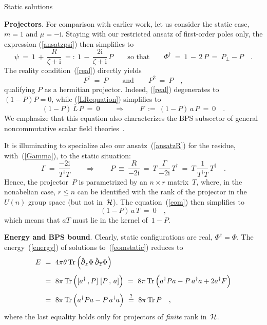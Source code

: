 \documentclass[a4paper,11pt]{article}
\makeatletter
\renewcommand{\section}{\@startsection{section}{1}{0pt}{\medskipamount}
{\medskipamount}{\large\bf}}
\numberwithin{equation}{section}
\newcommand{\Hcal}{{\cal H}}
\def\i{\mbox{i}}
\def\pa{\mbox{$\partial$}}
\newcommand{\adag}{a^{\dagger}}
\newcommand{\Tdag}{T^{\dagger}}
\newcommand{\zb}{\overline{z}}
\makeatother
\begin{document}
\section{Static solutions}

\noindent
{\bf Projectors}.
For comparison with earlier work, let us consider the static case,
$m=1$ and $\mu=-\i$.
Staying with our restricted ansatz of first-order poles only, the expression
(\ref{ansatzpsi}) then simplifies to
\begin{equation} \label{static}
\psi\ =\ 1\,+\,\frac{R}{\zeta+\i}\ =:\ 1\,-\,\frac{2\i}{\zeta+\i}\,P
\qquad\textrm{so that}\qquad \Phi^\dagger\ =\ 1\,-\,2\,P\ =\ P_\perp-P \quad.
\end{equation}
The reality condition~(\ref{real}) directly yields
\begin{equation}
P^\dagger\ =\ P \qquad\textrm{and}\qquad P^2\ =\ P \quad,
\end{equation}
qualifying $P$ as a hermitian projector.
Indeed, (\ref{real}) degenerates to $(1{-}P)P=0$,
while (\ref{LRequation}) simplifies to
\begin{equation} \label{eomstatic}
(1-P)\,\overline{L}\,P\ =\ 0 \qquad\Longrightarrow\qquad
F\ :=\ (1-P)\,a\,P\ =\ 0 \quad.
\end{equation}
We emphasize that this equation also characterizes the BPS subsector of
general noncommutative scalar field theories~\cite{gopa2,rocek}.

It is illuminating to specialize also our ansatz~(\ref{ansatzR})
for the residue, with~(\ref{Gamma}), to the static situation:
\begin{equation}
\Gamma\ =\ \frac{-2\i}{\Tdag T} \qquad\Longrightarrow\qquad
P\ \equiv\ \frac{R}{-2\i}\ =\ T\,\frac{\Gamma}{-2\i}\,\Tdag\ =\
T\,\frac{1}{\Tdag T}\,\Tdag \quad.
\end{equation}
Hence, the projector~$P$ is parametrized by an $n{\times}r$ matrix~$T$,
where, in the nonabelian case, $r{\le}n$ can be identified with
the rank of the projector in the $U(n)$ group space
(but not in~$\Hcal$).
The equation~(\ref{eom}) then simplifies to
\begin{equation} \label{eomstaticT}
(1-P)\,a\,T\ =\ 0 \quad,
\end{equation}
which means that $aT$ must lie in the kernel of~$1{-}P$.

\noindent
{\bf Energy and BPS bound}.
Clearly, static configurations are real, $\Phi^\dagger=\Phi$.
The energy~(\ref{energy}) of solutions to~(\ref{eomstatic}) reduces to
\begin{align} \label{energystatic}
E\ &=\ 4\pi \theta \,\mbox{Tr}\,\Bigl(
\hat{\pa}_z \Phi\,\hat{\pa}_{\zb} \Phi \Bigr)
\nonumber \\[4pt]
&=\ 8\pi\,\mbox{Tr}\,\Bigl( [\adag\,,P]\;[P\,,\,a] \Bigr)\
 =\ 8\pi\,\mbox{Tr}\,\Bigl( \adag Pa - P\,\adag a + 2\adag F \Bigr)
\nonumber \\[4pt]
&=\ 8\pi\,\mbox{Tr}\,\Bigl( \adag Pa - P\,\adag a \Bigr)\
\buildrel{?}\over{=}\ 8\pi\,\mbox{Tr}\,P \quad,
\end{align}
where the last equality holds only for
projectors of {\it finite\/} rank in~$\Hcal$.
\end{document}
